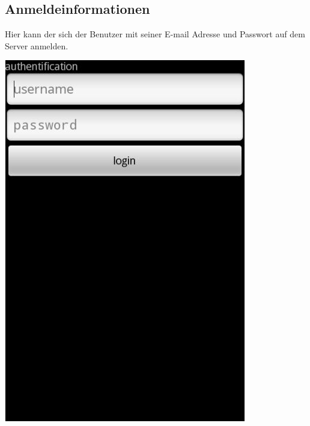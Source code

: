\documentclass[a4paper,10pt,titlepage]{article}
\begin{document}
\subsection{Anmeldeinformationen}
Hier kann der sich der Benutzer mit seiner E-mail Adresse und Passwort auf dem Server anmelden.
\begin {center}
\includegraphics[scale=0.35]{media/android/login.jpg}
\end {center}
\end{document}
